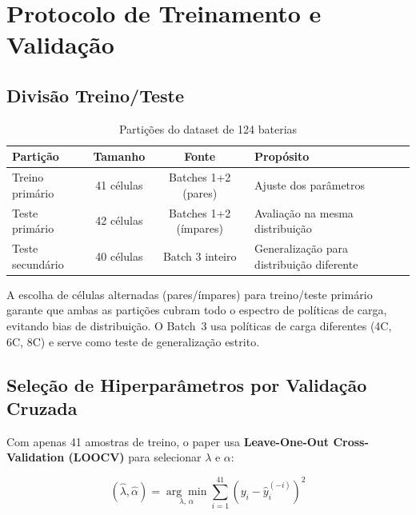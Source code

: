 \documentclass[12pt,a4paper]{article}
\begin{document}
\section{Protocolo de Treinamento e Valida\c{c}\~ao}

\subsection{Divis\~ao Treino/Teste}

\begin{table}[H]
\centering
\caption{Parti\c{c}\~oes do dataset de 124 baterias}
\begin{tabular}{@{}lccl@{}}
\toprule
\textbf{Parti\c{c}\~ao} & \textbf{Tamanho} & \textbf{Fonte} & \textbf{Prop\'{o}sito} \\
\midrule
Treino prim\'{a}rio    & 41 c\'{e}lulas & Batches 1+2 (pares) &
  Ajuste dos par\^{a}metros \\
Teste prim\'{a}rio     & 42 c\'{e}lulas & Batches 1+2 (\'{i}mpares) &
  Avalia\c{c}\~ao na mesma distribui\c{c}\~ao \\
Teste secund\'{a}rio   & 40 c\'{e}lulas & Batch 3 inteiro &
  Generaliza\c{c}\~ao para distribui\c{c}\~ao diferente \\
\bottomrule
\end{tabular}
\end{table}

A escolha de c\'{e}lulas alternadas (pares/\'{i}mpares) para treino/teste prim\'{a}rio
garante que ambas as parti\c{c}\~oes cubram todo o espectro de pol\'{i}ticas de carga,
evitando bias de distribui\c{c}\~ao. O Batch~3 usa pol\'{i}ticas de carga diferentes
(4C, 6C, 8C) e serve como teste de generaliza\c{c}\~ao estrito.

\subsection{Sele\c{c}\~ao de Hiperpar\^{a}metros por Valida\c{c}\~ao Cruzada}

Com apenas 41 amostras de treino, o paper usa
\textbf{Leave-One-Out Cross-Validation (LOOCV)} para selecionar
$\lambda$ e $\alpha$:

\begin{equation}
  (\hat{\lambda}, \hat{\alpha}) = \underset{\lambda,\,\alpha}{\arg\min}
  \sum_{i=1}^{41}\left(y_i - \hat{y}_i^{(-i)}\right)^2
\end{equation}
\end{document}

